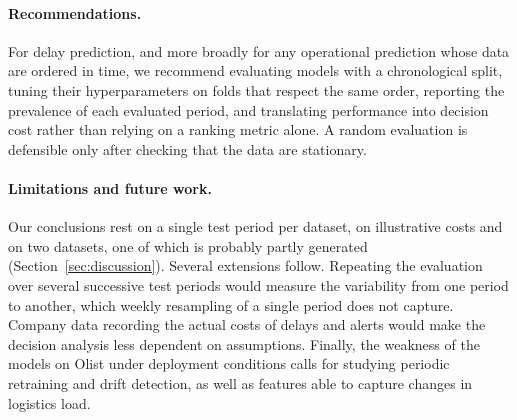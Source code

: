 \documentclass[11pt,a4paper]{article}
\theoremstyle{definition}
\begin{document}
\paragraph{Recommendations.} For delay prediction, and more broadly for any operational prediction whose data are ordered in time, we recommend evaluating models with a chronological split, tuning their hyperparameters on folds that respect the same order, reporting the prevalence of each evaluated period, and translating performance into decision cost rather than relying on a ranking metric alone. A random evaluation is defensible only after checking that the data are stationary.

\paragraph{Limitations and future work.} Our conclusions rest on a single test period per dataset, on illustrative costs and on two datasets, one of which is probably partly generated (Section~\ref{sec:discussion}). Several extensions follow. Repeating the evaluation over several successive test periods would measure the variability from one period to another, which weekly resampling of a single period does not capture. Company data recording the actual costs of delays and alerts would make the decision analysis less dependent on assumptions. Finally, the weakness of the models on Olist under deployment conditions calls for studying periodic retraining and drift detection, as well as features able to capture changes in logistics load.



\end{document}
